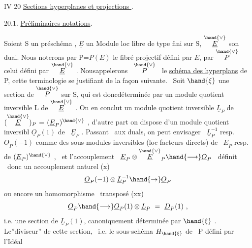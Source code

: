 IV 20 \quad \uline{Sections hyperplanes et projections }.

20.1. \quad \uline{Préliminaires  notations}.

Soient S un \quad préschéma , $\underline{E}$ un Module loc libre de type fini sur S,
$\overset{\hand{\vee}}{\underline{E}}$ son dual. Nous noterons par P=$\underline{P}(\underline{E})$ le fibré projectif défini par $\underline{E}$,
par $\overset{\hand{\vee}}{P}$ celui défini par $\overset{\hand{\vee}}{\underline{E}}$ . Nousappelerons \ $\overset{\hand{\vee}}{P}$ \ le \uline{schéma des hyperplans}
de P, cette terminologie se justifiant de la façon suivante. \ Soit
$\hand{\xi}$ une section de $\overset{\hand{\vee}}{P}$ sur S, qui est donc\hand{/}déterminée par un module quotient
inversible L de $\overset{\hand{\vee}}{\underline{E}}$ . On en conclut un module quotient inversible
$\underline{L}_P$ de$(\overset{\hand{\vee}}{\underline{E}})_P$ = $(\underline{E}_P)^{\hand{\vee}}$ , d'autre part on dispose d'un module quotient inversibl
$\underline{O}_P(1)$ de \ $\underline{E}_P$ . Passant \ aux duals, on peut envisager \ $\underline{L}_P^{-1}$ resp. $\underline{O}_P(-1)$
comme des sous-modules inversibles (loc facteurs directs) de \ $\underline{E}_P$ resp.
de $(\underline{E}_P)^{\hand{\vee}}$ , \ et l'accouplement \ $\underline{E}_P \otimes \overset{\hand{\vee}}{\underline{E}}_P \hand{\longrightarrow} \underline{O}_P$ \ définit \ donc un
accouplement naturel
(x) \[ \underline{O}_P(-1)\otimes\underline{L}_P^{-1} \hand{\to} \underline{O}_P \]
ou encore un homomorphisme \ transposé
(xx) \[ \underline{O}_P \hand{\longrightarrow} \underline{O}_P(1)\otimes\underline{L}_P \ = \ \underline{D}_P(1) \ , \]
i.e. une section de $\underline{L}_P(1)$, canoniquement déterminée par $\hand{\xi}$ . Le''diviseur''
de cette section, \ i.e. le sous-schéma $H_{\hand{\xi}}$ de \ P défini par l'Idéal
